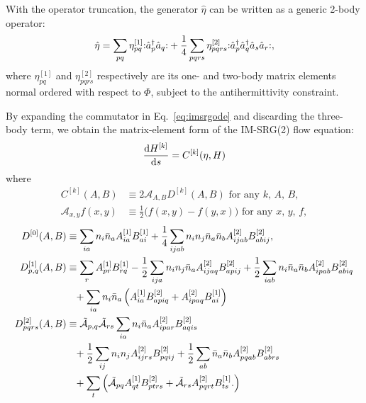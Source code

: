 With the operator truncation, the generator $\hat{\eta}$ can be written as a generic 2-body operator:
\begin{align*}
\hat{\eta} = \sum_{pq} \eta_{pq}^{[1]} \mathopen: \hat a_p^\dagger \hat a_q \mathclose: +
\frac{1}{4} \sum_{pqrs}\eta_{pqrs}^{[2]} \mathopen: \hat a_p^\dagger \hat a_q^\dagger \hat a_s \hat a_r \mathclose:,
\end{align*}
where $\eta_{pq}^{[1]}$ and $ \eta_{pqrs}^{[2]}$ respectively are its
one- and two-body matrix elements normal ordered with respect to
$\Phi$, subject to the antihermittivity constraint.

By expanding the commutator in Eq.~\eqref{eq:imsrgode} and discarding
the three-body term, we obtain the matrix-element form of the
IM-SRG(2) flow equation:
\begin{align}
    \frac{\operatorname{d\!} H^{[k]}}{\operatorname{d\!} s} = C^{[k]}(\eta, H) \label{eq:flowmxe}
\end{align}
where
\begin{align}
  C^{[k]}(A, B) &\equiv 2 \mathcal{A}_{A, B} D^{[k]}(A, B) \text{ for any $k$, $A$, $B$}, \label{eq:commutmxe} \\
  \mathcal{A}_{x, y} f(x, y) &\equiv \frac{1}{2} \bigl(f(x, y) - f(y, x)\bigr) \text{ for any $x$, $y$, $f$},
\end{align}
\begin{align}
  D^{[0]}(A, B)
  &\equiv
    \sum_{ia} n_i \bar{n}_a A^{[1]}_{ia} B^{[1]}_{ai}
    + \frac{1}{4} \sum_{ijab} n_i n_j \bar{n}_a \bar{n}_b A^{[2]}_{ijab} B^{[2]}_{abij},
    \label{eq:flow0} \\
  D^{[1]}_{p, q}(A, B)
  &\equiv
    \sum_{r} A^{[1]}_{pr} B^{[1]}_{rq}
    - \frac{1}{2} \sum_{ija} n_i n_j \bar{n}_a A^{[2]}_{ijaq} B^{[2]}_{apij}
    + \frac{1}{2} \sum_{iab} n_i \bar{n}_a \bar{n}_b A^{[2]}_{ipab} B^{[2]}_{abiq}
    \notag \\
  &\hphantom{=}
    + \sum_{ia} n_i \bar{n}_a \left(
    A^{[1]}_{ia} B^{[2]}_{apiq}
    + A^{[2]}_{ipaq} B^{[1]}_{ai}
    \right)
    \label{eq:flow1} \\
  D^{[2]}_{pqrs}(A, B)
  &\equiv
    \tilde{\mathcal{A}}_{p, q} \tilde{\mathcal{A}}_{rs}
    \sum_{ia} n_i \bar{n}_a A^{[2]}_{ipar} B^{[2]}_{aqis}
    \notag \\
  &\hphantom{=}
    + \frac{1}{2} \sum_{ij} n_i n_j A^{[2]}_{ijrs} B^{[2]}_{pqij}
    + \frac{1}{2} \sum_{ab} \bar{n}_a \bar{n}_b A^{[2]}_{pqab} B^{[2]}_{abrs}
    \notag \\
  &\hphantom{=}
    + \sum_{t} \left(
    \tilde{\mathcal{A}}_{pq} A^{[1]}_{qt} B^{[2]}_{ptrs}
    + \tilde{\mathcal{A}}_{rs} A^{[2]}_{pqrt} B^{[1]}_{ts}.
    \right)
    \label{eq:flow2}
\end{align}

